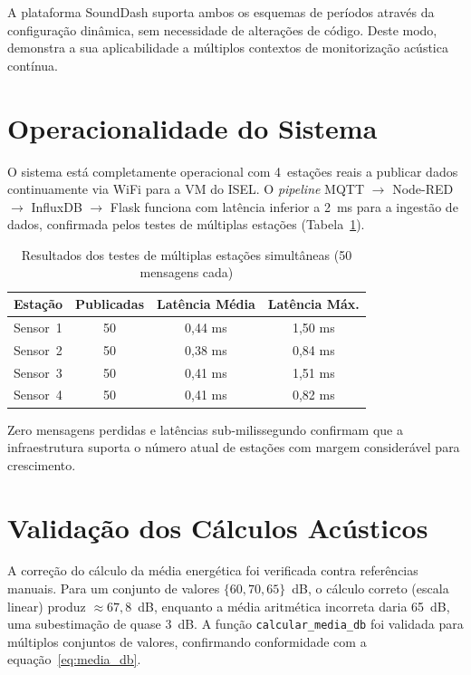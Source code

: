 \documentclass[12pt,a4paper]{report}
\begin{document}
A plataforma SoundDash suporta ambos os esquemas de períodos através da configuração dinâmica, sem necessidade de alterações de código. Deste modo, demonstra a sua aplicabilidade a múltiplos contextos de monitorização acústica contínua.

\section{Operacionalidade do Sistema}

O sistema está completamente operacional com 4~estações reais a publicar dados continuamente via WiFi para a VM do ISEL. O \textit{pipeline} MQTT $\to$ Node-RED $\to$ InfluxDB $\to$ Flask funciona com latência inferior a 2~ms para a ingestão de dados, confirmada pelos testes de múltiplas estações (Tabela~\ref{tab:multistation}).

\begin{table}[H]
\centering\small
\caption{Resultados dos testes de múltiplas estações simultâneas (50 mensagens cada)}
\label{tab:multistation}
\begin{tabular}{lccc}
\toprule
\textbf{Estação} & \textbf{Publicadas} & \textbf{Latência Média} & \textbf{Latência Máx.} \\
\midrule
Sensor~1 & 50 & 0{,}44 ms & 1{,}50 ms \\
Sensor~2 & 50 & 0{,}38 ms & 0{,}84 ms \\
Sensor~3 & 50 & 0{,}41 ms & 1{,}51 ms \\
Sensor~4 & 50 & 0{,}41 ms & 0{,}82 ms \\
\bottomrule
\end{tabular}
\end{table}

Zero mensagens perdidas e latências sub-milissegundo confirmam que a infraestrutura suporta o número atual de estações com margem considerável para crescimento.

\section{Validação dos Cálculos Acústicos}

A correção do cálculo da média energética foi verificada contra referências manuais. Para um conjunto de valores $\{60, 70, 65\}$~dB, o cálculo correto (escala linear) produz $\approx 67{,}8$~dB, enquanto a média aritmética incorreta daria 65~dB,  uma subestimação de quase 3~dB. A função \texttt{calcular\_media\_db} foi validada para múltiplos conjuntos de valores, confirmando conformidade com a equação~\eqref{eq:media_db}.
\end{document}
